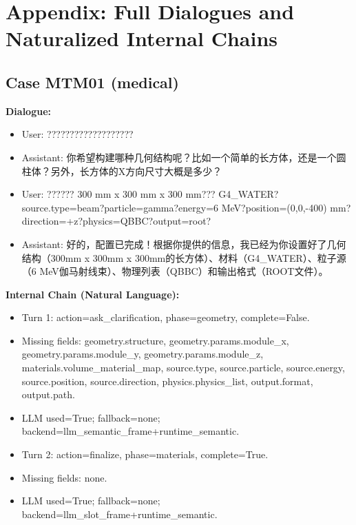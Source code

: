 \documentclass[11pt]{ctexart}
\begin{document}
\section{Appendix: Full Dialogues and Naturalized Internal Chains}
\subsection{Case MTM01 (medical)}
\textbf{Dialogue:}
\begin{itemize}
\item User: ???????????????????
\item Assistant: 你希望构建哪种几何结构呢？比如一个简单的长方体，还是一个圆柱体？另外，长方体的X方向尺寸大概是多少？
\item User: ?????? 300 mm x 300 mm x 300 mm??? G4\_WATER?source.type=beam?particle=gamma?energy=6 MeV?position=(0,0,-400) mm?direction=+z?physics=QBBC?output=root?
\item Assistant: 好的，配置已完成！根据你提供的信息，我已经为你设置好了几何结构（300mm x 300mm x 300mm的长方体）、材料（G4\_WATER）、粒子源（6 MeV伽马射线束）、物理列表（QBBC）和输出格式（ROOT文件）。
\end{itemize}
\textbf{Internal Chain (Natural Language):}
\begin{itemize}
\item Turn 1: action=ask\_clarification, phase=geometry, complete=False.
\item Missing fields: geometry.structure, geometry.params.module\_x, geometry.params.module\_y, geometry.params.module\_z, materials.volume\_material\_map, source.type, source.particle, source.energy, source.position, source.direction, physics.physics\_list, output.format, output.path.
\item LLM used=True; fallback=none; backend=llm\_semantic\_frame+runtime\_semantic.
\item Turn 2: action=finalize, phase=materials, complete=True.
\item Missing fields: none.
\item LLM used=True; fallback=none; backend=llm\_slot\_frame+runtime\_semantic.
\end{itemize}
\end{document}
